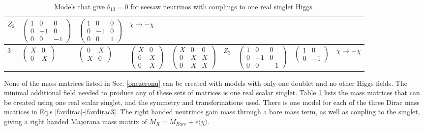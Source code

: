\documentclass[nofootinbib,showpacs]{revtex4}
\begin{document}
\begin{table}
\begin{center}
\begin{tabular}{|l|l|l|l|l|l|l|l|l|}
$Z_2$&
$\left(\begin{array}{ccc}1&0&0\\0&-1&0\\0&0&-1\end{array}\right)$&
$\left(\begin{array}{ccc}1&0&0\\0&-1&0\\0&0&1\end{array}\right)$&
$\chi \rightarrow -\chi$
\\
\hline
3&
$\left(\begin{array}{ccc}X&0\\0&X\end{array}\right)$&
$\left(\begin{array}{ccc}0&X\\X&0\end{array}\right)$&
$\left(\begin{array}{cc}X&0\\0&X\\0&X\end{array}\right)$&
$\left(\begin{array}{ccc}X&0&0\\0&X&X\\0&X&X\end{array}\right)$&
$Z_2$&
$\left(\begin{array}{ccc}1&0&0\\0&-1&0\\0&0&-1\end{array}\right)$&
$\left(\begin{array}{cc}1&0\\0&-1\end{array}\right)$&
$\chi \rightarrow -\chi $
\\
\hline
\end{tabular}
\end{center}
\caption{Models that give $\theta_{13}=0$ for seesaw neutrinos with couplings to one real  singlet Higgs.}
\label{tabseesaw}
\end{table}
   


None of the mass matrices listed in Sec. \ref{onezeronu} can be created with models with only one doublet and no other Higgs fields. The minimal additional field needed to produce any of these sets of matrices is one real scalar singlet.
Table \ref{tabseesaw} lists the mass matrices that can be created using one real scalar singlet, and the symmetry and transformations used. There is one model for each of the three Dirac mass matrices in Eq.s \ref{favdirac}-\ref{favdirac3}. The right handed neutrinos gain mass through a bare mass term, as well as coupling to the singlet, giving a right handed Majorana mass matrix of $M_R=M_{Bare}+\epsilon \langle \chi \rangle$. 
\end{document}
